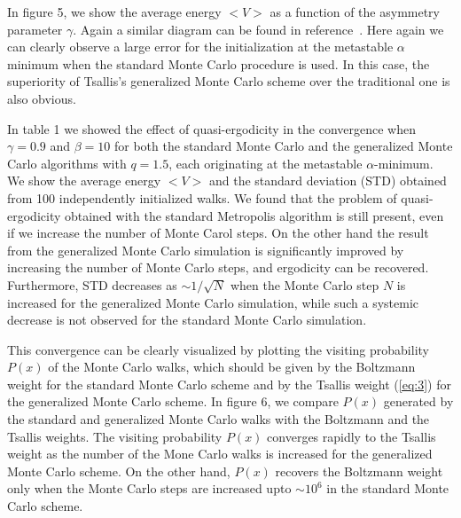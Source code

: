 In figure 5, we show the average energy $<V>$ as a function of 
the asymmetry parameter $\gamma$. Again a similar diagram can 
be found in reference~\cite{FFD}. Here again we can
clearly observe a large error for the initialization at the 
metastable $\alpha$ minimum when the standard Monte Carlo
procedure is used. In this case, the superiority of Tsallis's 
generalized Monte Carlo scheme over the traditional one is
also obvious.

In table 1 we showed the effect of quasi-ergodicity in the 
convergence when $\gamma=0.9$ and $\beta=10$ for both 
the standard Monte Carlo and the generalized Monte Carlo 
algorithms with $q=1.5$, each originating at the metastable 
$\alpha$-minimum. We show the average energy $<V>$ and the 
standard deviation (STD) obtained from 100 independently 
initialized walks. We found that the problem of quasi-ergodicity 
obtained with the standard Metropolis algorithm is still present, 
even if we increase the number of Monte Carol steps. On the other 
hand the result from the generalized Monte Carlo simulation is 
significantly improved by increasing the number of Monte Carlo
steps, and ergodicity can be recovered.  Furthermore, STD
decreases as $\sim 1/\sqrt{N}$ when the Monte Carlo step $N$ is 
increased for the generalized Monte Carlo simulation, while such 
a systemic decrease is not observed for the standard Monte 
Carlo simulation.

This convergence can be clearly visualized by plotting the
visiting probability $P(x)$ of the Monte Carlo walks, which 
should be given by the Boltzmann weight for the standard
Monte Carlo scheme and by the Tsallis weight (\ref{eq:3}) for
the generalized Monte Carlo scheme.  In figure 6, we compare 
$P(x)$ generated by the standard and generalized Monte Carlo 
walks with the Boltzmann and the Tsallis weights.  The visiting 
probability $P(x)$ converges rapidly to the Tsallis weight as 
the number of the Mone Carlo walks is increased for the 
generalized Monte Carlo scheme.  On the other hand, $P(x)$ 
recovers the Boltzmann weight only when the Monte Carlo steps 
are increased upto $\sim 10^{6}$ in the standard Monte 
Carlo scheme.

